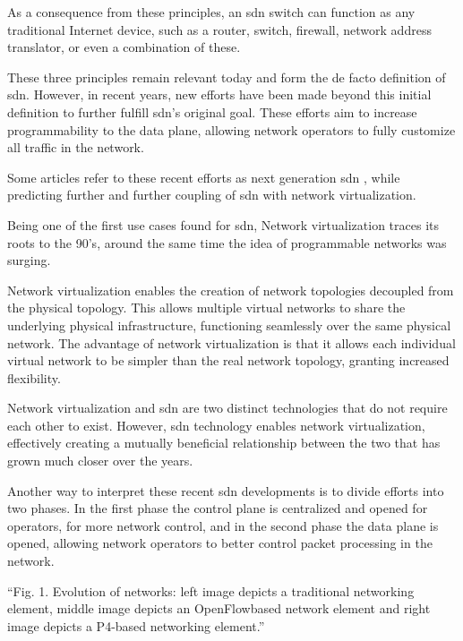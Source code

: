 As a consequence from these principles, an \gls{sdn} switch can function as any traditional Internet device, such as a router, switch, firewall, network address translator, or even a combination of these. 

These three principles remain relevant today and form the de facto definition of \gls{sdn}. However, in recent years, new efforts have been made beyond this initial definition to further fulfill \gls{sdn}'s original goal. These efforts aim to increase programmability to the data plane, allowing network operators to fully customize all traffic in the network.

Some articles refer to these recent efforts as next generation \gls{sdn} \cite{liatifis_advancing_2023} \cite{sofia_shaping_2024}, while predicting further and further coupling of \gls{sdn} with network virtualization.

Being one of the first use cases found for \gls{sdn}, Network virtualization traces its roots to the 90’s, around the same time the idea of programmable networks was surging. \cite{kreutz_software-defined_2015} \cite{feamster_road_2013} 

Network virtualization enables the creation of network topologies decoupled from the physical topology. This allows multiple virtual networks to share the underlying physical infrastructure, functioning seamlessly over the same physical network. \cite{thyagaturu_software_2016} The advantage of network virtualization is that it allows each individual virtual network to be simpler than the real network topology, granting increased flexibility. 

Network virtualization and \gls{sdn} are two distinct technologies that do not require each other to exist. However, \gls{sdn} technology enables network virtualization, effectively creating a mutually beneficial relationship between the two that has grown much closer over the years\cite{feamster_road_2013}.

Another way to interpret these recent \gls{sdn} developments is to divide efforts into two phases. In the first phase the control plane is centralized and opened for operators, for more network control, and in the second phase the data plane is opened, allowing network operators to better control packet processing in the network. 

“Fig. 1. Evolution of networks: left image depicts a traditional networking element, middle image depicts an OpenFlowbased network element and right image depicts a P4-based networking element.” \cite{liatifis_advancing_2023}

